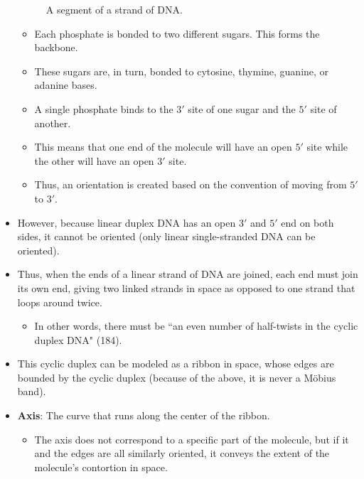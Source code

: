 \documentclass[titlepage]{article}
\numberwithin{figure}{section}
\numberwithin{table}{section}
\numberwithin{equation}{section}
\newcommand{\dq}[2]{``#1" (#2).}
\begin{document}
\begin{itemize}
\begin{figure}[h!]
        \vspace{2.3em}
        \caption{A segment of a strand of DNA.}
        \label{fig:DNA2bits}
    \end{figure}
    \begin{itemize}
        \item Each phosphate is bonded to two different sugars. This forms the backbone.
        \item These sugars are, in turn, bonded to cytosine, thymine, guanine, or adanine bases.
        \item A single phosphate binds to the $3'$ site of one sugar and the $5'$ site of another.
        \item This means that one end of the molecule will have an open $5'$ site while the other will have an open $3'$ site.
        \item Thus, an orientation is created based on the convention of moving from $5'$ to $3'$.
    \end{itemize}
    \item However, because linear duplex DNA has an open $3'$ and $5'$ end on both sides, it cannot be oriented (only linear single-stranded DNA can be oriented).
    \item Thus, when the ends of a linear strand of DNA are joined, each end must join its own end, giving two linked strands in space as opposed to one strand that loops around twice.
    \begin{itemize}
        \item In other words, there must be \dq{an even number of half-twists in the cyclic duplex DNA}{184}
    \end{itemize}
    \item This cyclic duplex can be modeled as a ribbon in space, whose edges are bounded by the cyclic duplex (because of the above, it is never a M\"{o}bius band).
    \item \textbf{Axis}: The curve that runs along the center of the ribbon.
    \begin{itemize}
        \item The axis does not correspond to a specific part of the molecule, but if it and the edges are all similarly oriented, it conveys the extent of the molecule's contortion in space.
    \end{itemize}
\end{itemize}
\end{document}

